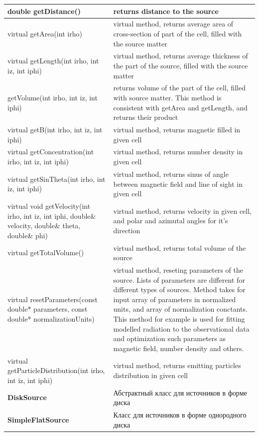 \begin{small}
\begin{xtabular}{|p{0.5\textwidth}|p{0.5\textwidth}|}
		\hline
		double getDistance() & returns distance to the source\\
		\hline
		virtual getArea(int irho) & virtual method, returns average area of cross-section of part of the cell, filled with the source matter\\
		\hline
		virtual getLength(int irho, int iz, int iphi) & virtual method, returns average thickness of the part of the source, filled with the source matter\\
		\hline
		getVolume(int irho, int iz, int iphi) & returns volume of the part of the cell, filled with source matter. This method is consistent with getArea and getLength, and returns their product\\
		\hline
		virtual getB(int irho, int iz, int iphi) & virtual method, returns magnetic filled in given cell\\
		\hline
		virtual getConcentration(int irho, int iz, int iphi) & virtual method, returns number density in given cell\\
		\hline
		virtual getSinTheta(int irho, int iz, int iphi) & virtual method, returns sinus of angle between magnetic field and line of sight in given cell\\
		\hline
		virtual void getVelocity(int irho, int iz, int iphi, double\& velocity, double\& theta, double\& phi) &
		virtual method, returns velocity in given cell, and polar and azimutal angles for it's direction\\
		\hline
		virtual getTotalVolume() & virtual method, returns total volume of the source\\
		\hline
		virtual resetParameters(const double* parameters, const double* normalizationUnits) &
		virtual method, reseting parameters of the source. Lists of parameters are different for different types of sources. Method takes for input array of parameters in normalized units, and array of normalization conctants. This method for example is used for fitting modelled radiation to the observational data and optimization such parameters as magnetic field, number density and others.\\
		\hline
		virtual getParticleDistribution(int irho, int iz, int iphi) & virtual method, returns emitting particles distribution in given cell\\
		\hline
		\textbf{DiskSource} & Абстрактный класс для источников в форме диска\\
		\hline
		\textbf{SimpleFlatSource} & Класс для источников в форме однородного диска\\
		\hline

\end{xtabular}
\end{small}
